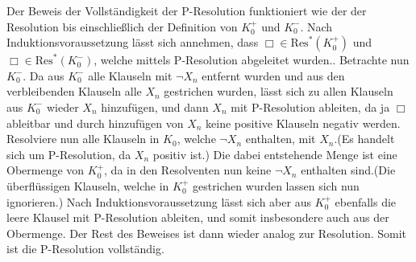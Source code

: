 \documentclass[11pt, a4paper]{article}
\begin{document}
\begin{adjustwidth}{20pt}{20pt}
Der Beweis der Vollständigkeit der P-Resolution funktioniert wie der der Resolution bis
einschließlich der Definition von $K_0^+$ und $K_0^-$. Nach Induktionsvoraussetzung lässt sich
annehmen, dass $\Box \in \text{Res}^*(K_0^+)$ und $\Box \in \text{Res}^*(K_0^-)$, welche mittels P-Resolution abgeleitet wurden.. Betrachte nun
$K_0^-$. Da aus $K_0^-$ alle Klauseln mit $\neg X_n$ entfernt wurden und aus den verbleibenden Klauseln alle $X_n$ gestrichen wurden, lässt sich zu allen Klauseln aus $K_0^-$ wieder
$X_n$ hinzufügen, und dann ${X_n}$ mit P-Resolution ableiten, da ja $\Box$ ableitbar und durch hinzufügen von ${X_n}$ keine positive Klauseln negativ werden. Resolviere nun alle Klauseln
in $K_0$, welche $\neg X_n$ enthalten, mit ${X_n}$.(Es handelt sich um P-Resolution, da ${X_n}$ positiv ist.) Die dabei entstehende Menge ist eine Obermenge von $K_0^+$, da in den Resolventen
nun keine $\neg X_n$ enthalten sind.(Die überflüssigen Klauseln, welche in $K_0^+$ gestrichen wurden lassen sich nun ignorieren.) Nach Induktionsvoraussetzung lässt sich aber aus $K_0^+$
ebenfalls die leere Klausel mit P-Resolution ableiten, und somit insbesondere auch aus der Obermenge. Der Rest des Beweises ist dann wieder analog zur Resolution. Somit ist die
P-Resolution vollständig.
\end{adjustwidth}
\end{document}
